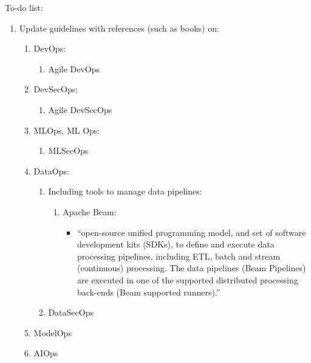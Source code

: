 \documentclass[letter,12pt]{article}
\begin{document}
To-do list: \vspace{-0.3cm}
\begin{enumerate} \itemsep -4pt
\item Update guidelines with references (such as books) on: \vspace{-0.3cm}
	\begin{enumerate} \itemsep -2pt
	\item DevOps: \vspace{-0.2cm}
		\begin{enumerate} \itemsep -2pt
		\item Agile DevOps
		\end{enumerate}
	\item DevSecOps: \vspace{-0.2cm}
		\begin{enumerate} \itemsep -2pt
		\item Agile DevSecOps
		\end{enumerate}
	\item MLOps, ML Ops: \vspace{-0.2cm}
		\begin{enumerate} \itemsep -2pt
		\item MLSecOps
		\end{enumerate}
	\item DataOps: \vspace{-0.2cm}
		\begin{enumerate} \itemsep -2pt
		\item Including tools to manage data pipelines: \vspace{-0.1cm}
			\begin{enumerate} \itemsep -1pt
			\item Apache Beam: \vspace{-0.1cm}
				\begin{itemize} \itemsep -1pt
				\item ``open-source unified programming model, and set of software development kits (SDKs), to define and execute data processing pipelines, including ETL, batch and stream (continuous) processing. The data pipelines (Beam Pipelines) are executed in one of the supported distributed processing back-ends (Beam supported runners).''
				\end{itemize}
			\end{enumerate}
		\item DataSecOps
		\end{enumerate}
	\item ModelOps
	\item AIOps

\end{enumerate}
\end{enumerate}
\end{document}
